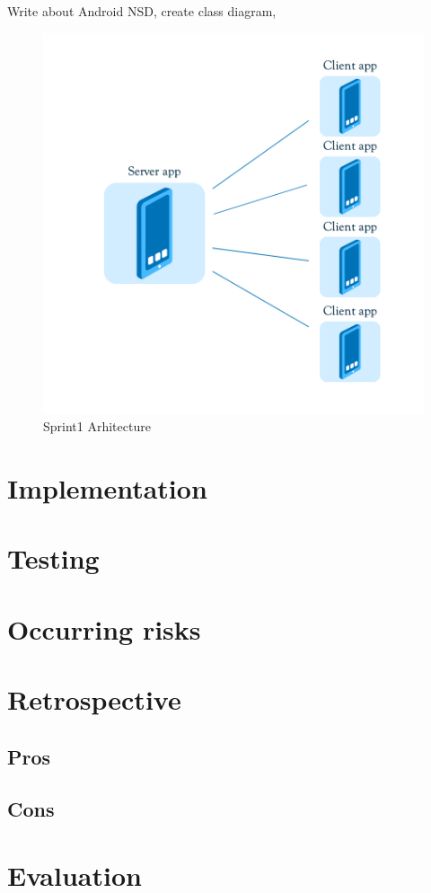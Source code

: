 Write about Android NSD, create class diagram, 


\begin{figure}[!t]
	\centering
		\includegraphics[width=16cm]{sprint1/arhitecture.png}
	\caption{Sprint1 Arhitecture}
	\label{fig:sprint1_arhitecture}
\end{figure}

\section{Implementation}
\section{Testing}
\section{Occurring risks}
\section{Retrospective}
\subsection{Pros}
\subsection{Cons}
\section{Evaluation}